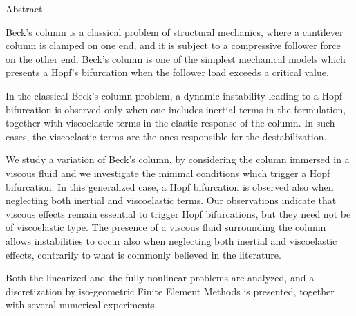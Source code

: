 \documentclass[12pt]{article}
\begin{document}
\begin{center}
Abstract
\end{center}
Beck's column is a classical problem of structural mechanics, where a cantilever column is clamped on one end, and it is subject to a compressive follower force on the other end. Beck's column is one of the simplest mechanical models which presents a Hopf's bifurcation when the follower load exceeds a critical value. 

In the classical Beck's column problem, a dynamic instability leading to a Hopf bifurcation is observed only when one includes inertial terms in the formulation, together with viscoelastic terms in the elastic response of the column. In such cases, the viscoelastic terms are the ones responsible for the destabilization.  

We study a variation of Beck's column, by considering the column immersed in a viscous fluid and we investigate the minimal conditions which trigger a Hopf bifurcation. In this generalized case, a Hopf bifurcation is observed also when neglecting both inertial and viscoelastic terms. Our observations indicate that viscous effects remain essential to trigger Hopf bifurcations, but they need not be of viscoelastic type. The presence of a viscous fluid surrounding the column allows instabilities to occur also when neglecting both inertial and viscoelastic effects, contrarily to what is commonly believed in the literature.

Both the linearized and the fully nonlinear problems are analyzed, and a discretization by iso-geometric Finite Element Methods is presented, together with several numerical experiments. 
\end{document}
